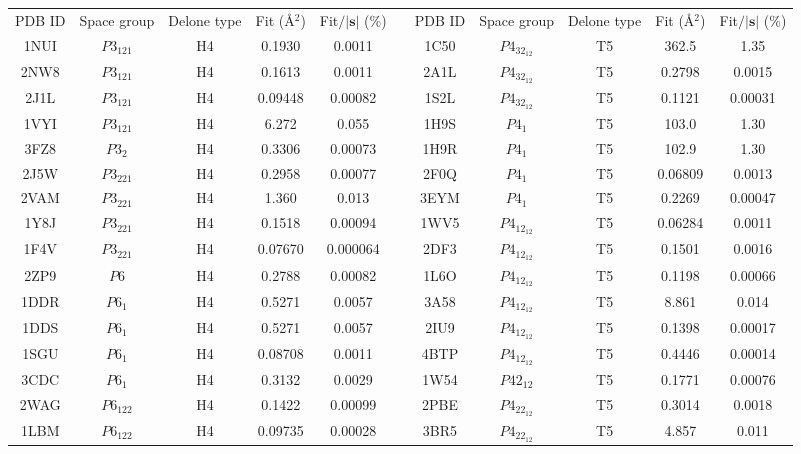 \documentclass[preprint]{iucr}              %
\begin{document}
	\begin{table}
		\setlength{\tabcolsep}{5pt}
		\begin{tabular}{ccccc@{\hspace{18pt}}c@{\hspace{18pt}}ccccc}
			\toprule
			PDB ID & Space group & Delone type & Fit ({\AA}$^2$) & Fit$/|\mathbf{s}|$ (\%) && PDB ID & Space group & Delone type & Fit ({\AA}$^2$) & Fit$/|\mathbf{s}|$ (\%) \\
			\cmidrule{1-5}\cmidrule{7-11}
			1NUI&$P3_121$&H4&0.1930&0.0011 && 1C50&$P4_32_12$&T5&362.5&1.35\\
			2NW8&$P3_121$&H4&0.1613&0.0011 && 2A1L&$P4_32_12$&T5&0.2798&0.0015\\
			2J1L&$P3_121$&H4&0.09448&0.00082 && 1S2L&$P4_32_12$&T5&0.1121&0.00031\\
			1VYI&$P3_121$&H4&6.272&0.055 && 1H9S&$P4_1$&T5&103.0&1.30\\
			3FZ8&$P3_2$&H4&0.3306&0.00073 && 1H9R&$P4_1$&T5&102.9&1.30\\
			2J5W&$P3_221$&H4&0.2958&0.00077 && 2F0Q&$P4_1$&T5&0.06809&0.0013\\
			2VAM&$P3_221$&H4&1.360&0.013 && 3EYM&$P4_1$&T5&0.2269&0.00047\\
			1Y8J&$P3_221$&H4&0.1518&0.00094 && 1WV5&$P4_12_12$&T5&0.06284&0.0011\\
			1F4V&$P3_221$&H4&0.07670&0.000064 && 2DF3&$P4_12_12$&T5&0.1501&0.0016\\
			2ZP9&$P6$&H4&0.2788&0.00082 && 1L6O&$P4_12_12$&T5&0.1198&0.00066\\
			1DDR&$P6_1$&H4&0.5271&0.0057 && 3A58&$P4_12_12$&T5&8.861&0.014\\
			1DDS&$P6_1$&H4&0.5271&0.0057 && 2IU9&$P4_12_12$&T5&0.1398&0.00017\\
			1SGU&$P6_1$&H4&0.08708&0.0011 && 4BTP&$P4_12_12$&T5&0.4446&0.00014\\
			3CDC&$P6_1$&H4&0.3132&0.0029 && 1W54&$P42_12$&T5&0.1771&0.00076\\
			2WAG&$P6_122$&H4&0.1422&0.00099 && 2PBE&$P4_22_12$&T5&0.3014&0.0018\\
			1LBM&$P6_122$&H4&0.09735&0.00028 && 3BR5&$P4_22_12$&T5&4.857&0.011\\

\end{tabular}
\end{table}
\end{document}

